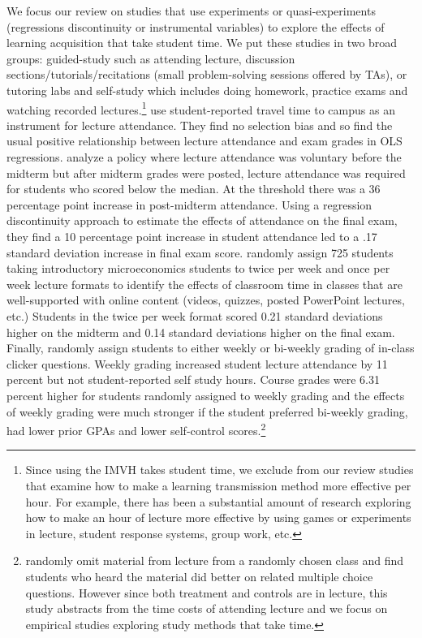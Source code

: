 \documentclass[12pt]{article}
\begin{document}
We focus our review on studies that use experiments or quasi-experiments (regressions discontinuity or instrumental variables) to explore the effects of learning acquisition that take student time. We put these studies in two broad groups: guided-study such as attending lecture, discussion sections/tutorials/recitations (small problem-solving sessions offered by TAs), or tutoring labs and self-study which includes doing homework, practice exams and watching recorded lectures.\footnote{Since using the IMVH takes student time, we exclude from our review studies that examine how to make a learning transmission method more effective per hour. For example, there has been a substantial amount of research exploring how to make an hour of lecture more effective by using games or experiments in lecture, student response systems, group work, etc.} \textcite{km2003} use student-reported travel time to campus as an instrument for lecture attendance. They find no selection bias and so find the usual positive relationship between lecture attendance and exam grades in OLS regressions. \textcite{dgm2010} analyze a policy where lecture attendance was voluntary before the midterm but after midterm grades were posted, lecture attendance was required for students who scored below the median. At the threshold there was a 36 percentage point increase in post-midterm attendance. Using a regression discontinuity approach to estimate the effects of attendance on the final exam, they find a 10 percentage point increase in student attendance led to a .17 standard deviation increase in final exam score. \textcite{jcjao2015} randomly assign 725 students taking introductory microeconomics students to twice per week and once per week lecture formats to identify the effects of classroom time in classes that are well-supported with online content (videos, quizzes, posted PowerPoint lectures, etc.) Students in the twice per week format scored 0.21 standard deviations higher on the midterm and 0.14 standard deviations higher on the final exam. Finally, \textcite{tlad2020} randomly assign students to either weekly or bi-weekly grading of in-class clicker questions. Weekly grading increased student lecture attendance by 11 percent but not student-reported self study hours. Course grades were 6.31 percent higher for students randomly assigned to weekly grading and the effects of weekly grading were much stronger if the student preferred bi-weekly grading, had lower prior GPAs and lower self-control scores.\footnote{\textcite{cl2008} randomly omit material from lecture from a randomly chosen class and find students who heard the material did better on related multiple choice questions. However since both treatment and controls are in lecture, this study abstracts from the time costs of attending lecture and we focus on empirical studies exploring study methods that take time.}
\end{document}
